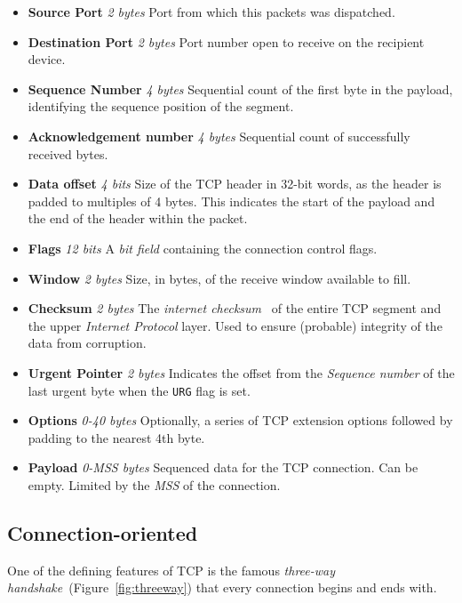         \begin{itemize}
            \item \textbf{Source Port} \textit{2 bytes} Port from which this packets was dispatched.
            \item \textbf{Destination Port} \textit{2 bytes} Port number open to receive on the recipient device.
            \item \textbf{Sequence Number} \textit{4 bytes} Sequential count of the first byte in the payload, identifying the sequence position of the segment.
            \item \textbf{Acknowledgement number} \textit{4 bytes} Sequential count of successfully received bytes.
            \item \textbf{Data offset} \textit{4 bits} Size of the TCP header in 32-bit words, as the header is padded to multiples of 4 bytes. This indicates the start of the payload and the end of the header within the packet.
            \item \textbf{Flags} \textit{12 bits} A \textit{bit field} containing the connection control flags.
            \item \textbf{Window} \textit{2 bytes} Size, in bytes, of the receive window available to fill.
            \item \textbf{Checksum} \textit{2 bytes} The \textit{internet checksum}~\cite{internetchecksum} of the entire TCP segment and the upper \textit{Internet Protocol} layer. Used to ensure (probable) integrity of the data from corruption.
            \item \textbf{Urgent Pointer} \textit{2 bytes} Indicates the offset from the \textit{Sequence number} of the last urgent byte when the \texttt{URG} flag is set.
            \item \textbf{Options} \textit{0-40 bytes} Optionally, a series of TCP extension options followed by padding to the nearest 4th byte.%
            \item \textbf{Payload} \textit{0-MSS bytes} Sequenced data for the TCP connection. Can be empty. Limited by the \textit{MSS} of the connection.
        \end{itemize}

    \subsection{Connection-oriented}
        One of the defining features of TCP is the famous \textit{three-way handshake}~(Figure~\ref{fig:threeway}) that every connection begins and ends with.

